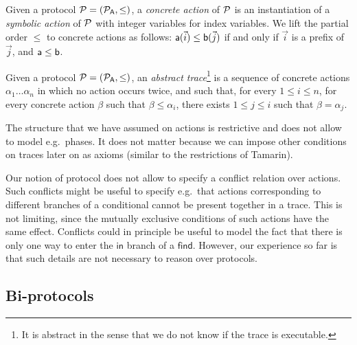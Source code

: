 \begin{definition}
  Given a protocol $\mathcal{P} = (\mathcal{P}_{\textsf{A}}, \leq)$, a \emph{concrete action} of $\mathcal{P}$ is an instantiation of a \emph{symbolic action} of $\mathcal{P}$ with integer variables for index variables. We lift the partial order $\leq$ to concrete actions as follows:
  $\textsf{a}(\vec{i}) \le \textsf{b}(\vec{j})$ if and only if $\vec{i}$ is a prefix of $\vec{j}$, and $\textsf{a} \le \textsf{b}$.
\end{definition}

\begin{definition}
  \label{def:trace}
  Given a protocol $\mathcal{P} = (\mathcal{P}_{\textsf{A}}, \leq)$,
  an \emph{abstract trace}\footnote{
    It is abstract in the sense that we do not know if the trace
    is executable. } is a sequence of concrete actions
  $\alpha_1 \dots \alpha_n$
  in which no action occurs twice, and such that,
  for every $1 \leq i \leq n$,
  for every concrete action $\beta$ such that $\beta \leq \alpha_i$,
  there exists $1 \leq j \leq i$ such that $\beta = \alpha_j$.
\end{definition}

\begin{remark}
  The structure that we have assumed on actions is restrictive and
  does not allow to model e.g.\ phases. It does not matter because we can
  impose other conditions on traces later on as axioms (similar to the
  restrictions of Tamarin).
\end{remark}

\begin{remark}
  Our notion of protocol does not allow to specify a conflict relation
  over actions. Such conflicts might be useful to specify e.g.\ that
  actions corresponding to different branches of a conditional cannot
  be present together in a trace. This is not limiting, since the
  mutually exclusive conditions of such actions have the same effect.
  Conflicts could in principle be useful to model the fact that there is only
  one way to enter the $\mathsf{in}$ branch of a $\mathsf{find}$. However,
  our experience so far is that such details are not necessary to reason
  over protocols. 
\end{remark}

\subsection{Bi-protocols}

